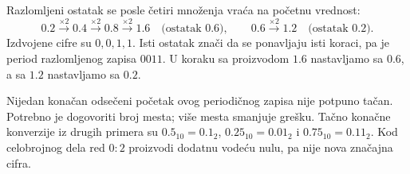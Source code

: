 
Razlomljeni ostatak se posle četiri množenja vraća na početnu vrednost:
\[0.2\xrightarrow{\times2}0.4\xrightarrow{\times2}0.8
\xrightarrow{\times2}1.6\quad\text{(ostatak }0.6\text{)},\qquad
0.6\xrightarrow{\times2}1.2\quad\text{(ostatak }0.2\text{)}.\]
Izdvojene cifre su $0,0,1,1$. Isti ostatak znači da se ponavljaju isti koraci, pa je period razlomljenog zapisa $0011$. U koraku sa proizvodom $1.6$ nastavljamo sa $0.6$, a sa $1.2$ nastavljamo sa $0.2$.

Nijedan konačan odsečeni početak ovog periodičnog zapisa nije potpuno tačan. Potrebno je dogovoriti broj mesta; više mesta smanjuje grešku. Tačno konačne konverzije iz drugih primera su $0.5_{10}=0.1_2$, $0.25_{10}=0.01_2$ i $0.75_{10}=0.11_2$. Kod celobrojnog dela red $0{:}2$ proizvodi dodatnu vodeću nulu, pa nije nova značajna cifra.
